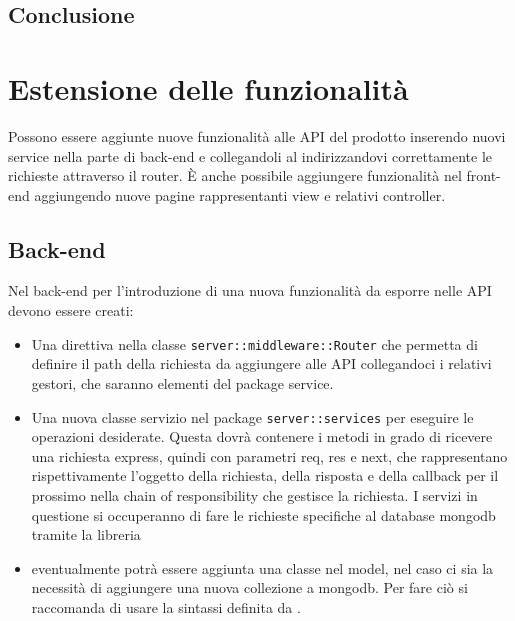 \documentclass[12pt,a4paper]{article}
\begin{document}
	\subsection{Conclusione}
	\newpage
	\section{Estensione delle funzionalità}
	Possono essere aggiunte nuove funzionalità alle API del prodotto inserendo nuovi service nella parte di back-end e collegandoli al indirizzandovi correttamente le richieste attraverso il router. È anche possibile aggiungere funzionalità nel front-end aggiungendo nuove pagine rappresentanti view e relativi controller.

	\subsection{Back-end}
	Nel back-end per l'introduzione di una nuova funzionalità da esporre nelle API devono essere creati:
	\begin{itemize}
	\item Una direttiva nella classe \texttt{server::middleware::Router} che permetta di definire il path della richiesta da aggiungere alle API collegandoci i relativi gestori, che saranno elementi del package service.
	\item Una nuova classe servizio nel package \texttt{server::services} per eseguire le operazioni desiderate. Questa dovrà contenere i metodi in grado di ricevere una richiesta express, quindi con parametri req, res e next, che rappresentano rispettivamente l’oggetto della richiesta, della risposta e della callback per il prossimo  nella chain of responsibility che gestisce la richiesta. I servizi in questione si occuperanno di fare le richieste specifiche al database mongodb tramite la libreria 
	\item eventualmente potrà essere aggiunta una classe nel model, nel caso ci sia la necessità di aggiungere una nuova collezione a mongodb. Per fare ciò si raccomanda di usare la sintassi definita da .
	\end{itemize}
\end{document}
